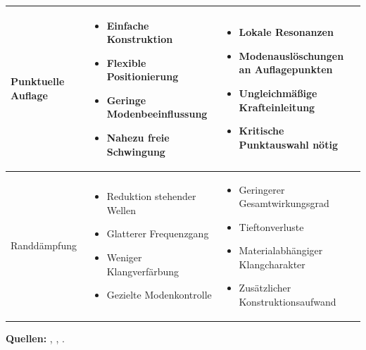 \begin{table}[htbp]
\begin{tabularx}{\textwidth}{|X|X|X|}
\hline
Punktuelle Auflage &
\vspace{-2mm}
\begin{itemize}[leftmargin=*, nosep, topsep=0pt, parsep=0pt]
    \item Einfache Konstruktion
    \item Flexible Positionierung
    \item Geringe Modenbeeinflussung
    \item Nahezu freie Schwingung
\end{itemize}
\vspace{-2mm}
&
\vspace{-2mm}
\begin{itemize}[leftmargin=*, nosep, topsep=0pt, parsep=0pt]
    \item Lokale Resonanzen
    \item Modenauslöschungen an Auflagepunkten
    \item Ungleichmäßige Krafteinleitung
    \item Kritische Punktauswahl nötig
\end{itemize}
\vspace{-2mm} \\
\hline
Randdämpfung &
\vspace{-2mm}
\begin{itemize}[leftmargin=*, nosep, topsep=0pt, parsep=0pt]
    \item Reduktion stehender Wellen
    \item Glatterer Frequenzgang
    \item Weniger Klangverfärbung
    \item Gezielte Modenkontrolle
\end{itemize}
\vspace{-2mm}
&
\vspace{-2mm}
\begin{itemize}[leftmargin=*, nosep, topsep=0pt, parsep=0pt]
    \item Geringerer Gesamtwirkungsgrad
    \item Tieftonverluste
    \item Materialabhängiger Klangcharakter
    \item Zusätzlicher Konstruktionsaufwand
\end{itemize}
\vspace{-2mm} \\
\hline
\end{tabularx}

\vspace{0.2cm}
\scriptsize
\textbf{Quellen:} \cite{Bai2001}, \cite{Cremer1996}, \cite{Moeser2010}.
\end{table}


